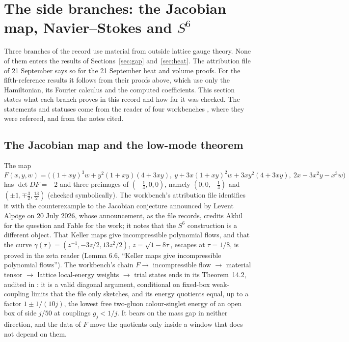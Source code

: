 \section{The side branches: the Jacobian map, Navier--Stokes and \texorpdfstring{$S^6$}{S6}}\label{sec:side}

Three branches of the record use material from outside lattice gauge theory. None of them enters the results of Sections~\ref{sec:gap} and~\ref{sec:heat}. The attribution file of 21 September says so for the 21 September heat and volume proofs. For the fifth-reference results it follows from their proofs above, which use only the Hamiltonian, its Fourier calculus and the computed coefficients. This section states what each branch proves in this record and how far it was checked. The statements and statuses come from the reader of four workbenches \cite{WorkbenchReader}, where they were refereed, and from the notes cited.

\subsection{The Jacobian map and the low-mode theorem}

The map
\[
F(x,y,w)=\bigl((1+xy)^3w+y^2(1+xy)(4+3xy),\ y+3x(1+xy)^2w+3xy^2(4+3xy),\ 2x-3x^2y-x^3w\bigr)
\]
has $\det DF=-2$ and three preimages of $(-\frac14,0,0)$, namely $(0,0,-\frac14)$ and $(\pm1,\mp\frac32,\frac{13}2)$ (checked symbolically). The workbench's attribution file identifies it with the counterexample to the Jacobian conjecture announced by Levent Alpöge on 20 July 2026, whose announcement, as the file records, credits Akhil for the question and Fable for the work; it notes that the $S^6$ construction is a different object. That Keller maps give incompressible polynomial flows, and that the curve $\gamma(\tau)=(z^{-1},-3z/2,13z^2/2)$, $z=\sqrt{1-8\tau}$, escapes at $\tau=1/8$, is proved in the zeta reader \cite{ZetaReader} (Lemma 6.6, ``Keller maps give incompressible polynomial flows'').
The workbench's chain $F\to$ incompressible flow $\to$ material tensor $\to$ lattice local-energy weights $\to$ trial states ends in its Theorem~14.2, audited in : it is a valid diagonal argument, conditional on fixed-box weak-coupling limits that the file only sketches, and its energy quotients equal, up to a factor $1\pm1/(10j)$, the lowest free two-gluon colour-singlet energy of an open box of side $j/50$ at couplings $g_j<1/j$. It bears on the mass gap in neither direction, and the data of $F$ move the quotients only inside a window that does not depend on them.

